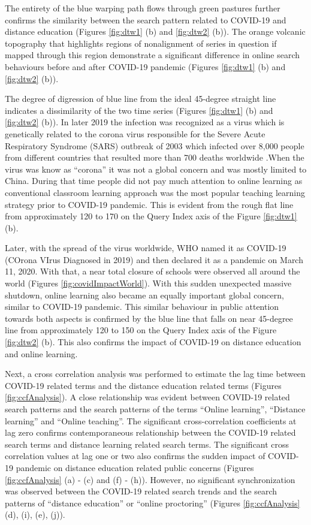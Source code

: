\documentclass[11pt,a4paper,]{article}
\begin{document}
The entirety of the blue warping path flows through green pastures further confirms the similarity between the search pattern related to COVID-19 and distance education (Figures \ref{fig:dtw1} (b) and \ref{fig:dtw2} (b)). The orange volcanic topography that highlights regions of nonalignment of series in question if mapped through this region demonstrate a significant difference in online search behaviours before and after COVID-19 pandemic (Figures \ref{fig:dtw1} (b) and \ref{fig:dtw2} (b)).

The degree of digression of blue line from the ideal 45-degree straight line indicates a dissimilarity of the two time
series (Figures \ref{fig:dtw1} (b) and \ref{fig:dtw2} (b)). In later 2019 the infection was recognized as a virus which is genetically related to the corona virus responsible for the Severe Acute Respiratory Syndrome (SARS) outbreak of 2003 which infected over 8,000 people from different countries that resulted more than 700 deaths worldwide \autocite{ciotti2019covid}.When the virus was know as ``corona'' it was not a global concern and was mostly limited to China. During that time people did not pay much attention to online learning as conventional classroom learning approach was the most popular teaching learning strategy prior to COVID-19 pandemic. This is evident from the rough flat line from approximately 120 to 170 on the Query Index axis of the Figure \ref{fig:dtw1} (b).

Later, with the spread of the virus worldwide, WHO named it as COVID-19 (COrona VIrus Diagnosed in 2019) and then declared it as a pandemic on March 11, 2020. With that, a near total closure of schools were observed all around the world (Figures \ref{fig:covidImpactWorld}). With this sudden unexpected massive shutdown, online learning also became an equally important global concern, similar to COVID-19 pandemic. This similar behaviour in public attention towards both aspects is confirmed by the blue line that falls on near 45-degree line from approximately 120 to 150 on the Query Index axis of the Figure \ref{fig:dtw2} (b). This also confirms the impact of COVID-19 on distance education and online learning.

Next, a cross correlation analysis was performed to estimate the lag time between COVID-19 related terms and the distance education related terms (Figures \ref{fig:ccfAnalysis}). A close relationship was evident between COVID-19 related search patterns and the search patterns of the terms ``Online learning'', ``Distance learning'' and ``Online teaching''. The significant cross-correlation coefficients at lag zero confirms contemporaneous relationship between the COVID-19 related search terms and distance learning related search terms. The significant cross correlation values at lag one or two also confirms the sudden impact of COVID-19 pandemic on distance education related public concerns (Figures \ref{fig:ccfAnalysis} (a) - (c) and (f) - (h)). However, no significant synchronization was observed between the COVID-19 related search trends and the search patterns of ``distance education'' or ``online proctoring'' (Figures \ref{fig:ccfAnalysis} (d), (i), (e), (j)).
\end{document}
